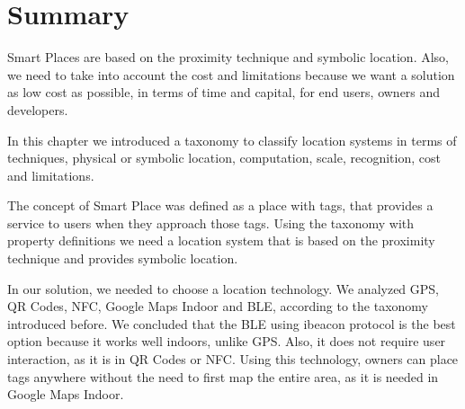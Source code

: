 \section{Summary}
\label{sec:background_summary}

Smart Places are based on the proximity technique and symbolic location.
Also, we need to take into account the cost and limitations because we want a solution as low cost as possible, in terms of time and capital, for end users, owners and developers.

In this chapter we introduced a taxonomy to classify location systems in terms of techniques, physical or symbolic location, computation, scale, recognition, cost and limitations.

The concept of Smart Place was defined as a place with tags, that provides a service to users when they approach those tags.
Using the taxonomy with property definitions we need a location system that is based on the proximity technique and provides symbolic location.

In our solution, we needed to choose a location technology.
We analyzed \gls{GPS}, \gls{QR} Codes, \gls{NFC}, Google Maps Indoor and \gls{BLE}, according to the taxonomy introduced before.
We concluded that the \gls{BLE} using ibeacon protocol is the best option because it works well indoors, unlike \gls{GPS}.
Also, it does not require user interaction, as it is in \gls{QR} Codes or \gls{NFC}.
Using this technology, owners can place tags anywhere without the need to first map the entire area, as it is needed in Google Maps Indoor.
